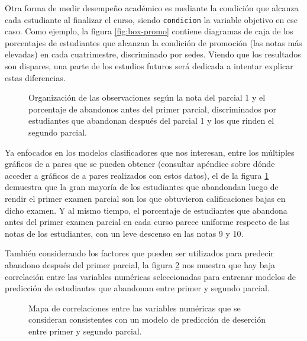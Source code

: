 \documentclass[a4paper,11pt,dvipsnames]{article}
\begin{document}
Otra forma de medir desempeño académico es mediante la condición que alcanza cada estudiante al finalizar el curso, siendo \texttt{condicion} la variable objetivo en ese caso. Como ejemplo, la figura \ref{fig:box-promo} contiene diagramas de caja de los porcentajes de estudiantes que alcanzan la condición de promoción (las notas más elevadas) en cada cuatrimestre, discriminado por sedes. Viendo que los resultados son dispares, una parte de los estudios futuros será dedicada a intentar explicar estas diferencias.\par\medskip

\begin{figure}[!hb]
    \begin{center}
        
    \end{center}
    \caption{Organización de las observaciones según la nota del parcial 1 y el porcentaje de abandonos antes del primer parcial, discriminados por estudiantes que abandonan después del parcial 1 y los que rinden el segundo parcial.}
    \label{fig:pa1}
\end{figure}

 
Ya enfocados en los modelos clasificadores que nos interesan, entre los múltiples gráficos de a pares que se pueden obtener (consultar apéndice sobre dónde acceder a gráficos de a pares realizados con estos datos), el de la figura \ref{fig:pa1} demuestra que la gran mayoría de los estudiantes que abandondan luego de rendir el primer examen parcial son los que obtuvieron calificaciones bajas en dicho examen. Y al mismo tiempo, el porcentaje de estudiantes que abandona antes del primer examen parcial en cada curso parece uniforme respecto de las notas de los estudiantes, con un leve descenso en las notas 9 y 10.\par\medskip 

También considerando los factores que pueden ser utilizados para predecir abandono después del primer parcial, la figura \ref{fig:corr} nos muestra que hay baja correlación entre las variables numéricas seleccionadas para entrenar modelos de predicción de estudiantes que abandonan entre primer y segundo parcial. \par\medskip

\begin{figure}[!ht]
    \begin{center}
        
    \end{center}
    \caption{Mapa de correlaciones entre las variables numéricas que se consideran consistentes con un modelo de predicción de deserción entre primer y segundo parcial.}
    \label{fig:corr}
\end{figure}
\end{document}
